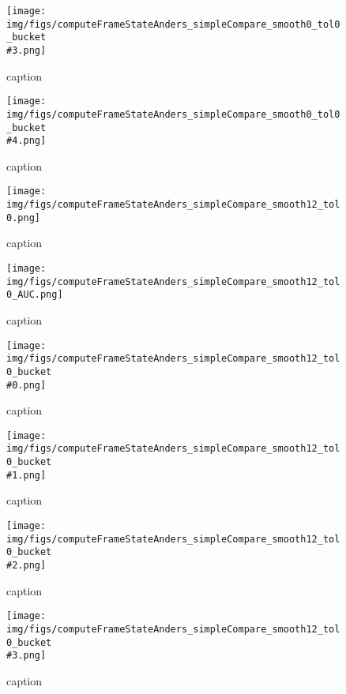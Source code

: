 %
\begin{figure}[!ht]
	\centering
	\texttt{[image: img/figs/computeFrameStateAnders\_simpleCompare\_smooth0\_tol0\_bucket\\\#3.png]}
	\caption{caption}
	\label{fig:computeFrameStateAnders_simpleCompare_smooth0_tol0_bucket\#3.png}
\end{figure}
%
\begin{figure}[!ht]
	\centering
	\texttt{[image: img/figs/computeFrameStateAnders\_simpleCompare\_smooth0\_tol0\_bucket\\\#4.png]}
	\caption{caption}
	\label{fig:computeFrameStateAnders_simpleCompare_smooth0_tol0_bucket\#4.png}
\end{figure}
%
\begin{figure}[!ht]
	\centering
	\texttt{[image: img/figs/computeFrameStateAnders\_simpleCompare\_smooth12\_tol0.png]}
	\caption{caption}
	\label{fig:computeFrameStateAnders_simpleCompare_smooth12_tol0.png}
\end{figure}
%
\begin{figure}[!ht]
	\centering
	\texttt{[image: img/figs/computeFrameStateAnders\_simpleCompare\_smooth12\_tol0\_AUC.png]}
	\caption{caption}
	\label{fig:computeFrameStateAnders_simpleCompare_smooth12_tol0_AUC.png}
\end{figure}
%
\begin{figure}[!ht]
	\centering
	\texttt{[image: img/figs/computeFrameStateAnders\_simpleCompare\_smooth12\_tol0\_bucket\\\#0.png]}
	\caption{caption}
	\label{fig:computeFrameStateAnders_simpleCompare_smooth12_tol0_bucket\#0.png}
\end{figure}
%
\begin{figure}[!ht]
	\centering
	\texttt{[image: img/figs/computeFrameStateAnders\_simpleCompare\_smooth12\_tol0\_bucket\\\#1.png]}
	\caption{caption}
	\label{fig:computeFrameStateAnders_simpleCompare_smooth12_tol0_bucket\#1.png}
\end{figure}
%
\begin{figure}[!ht]
	\centering
	\texttt{[image: img/figs/computeFrameStateAnders\_simpleCompare\_smooth12\_tol0\_bucket\\\#2.png]}
	\caption{caption}
	\label{fig:computeFrameStateAnders_simpleCompare_smooth12_tol0_bucket\#2.png}
\end{figure}
%
\begin{figure}[!ht]
	\centering
	\texttt{[image: img/figs/computeFrameStateAnders\_simpleCompare\_smooth12\_tol0\_bucket\\\#3.png]}
	\caption{caption}
	\label{fig:computeFrameStateAnders_simpleCompare_smooth12_tol0_bucket\#3.png}
\end{figure}
